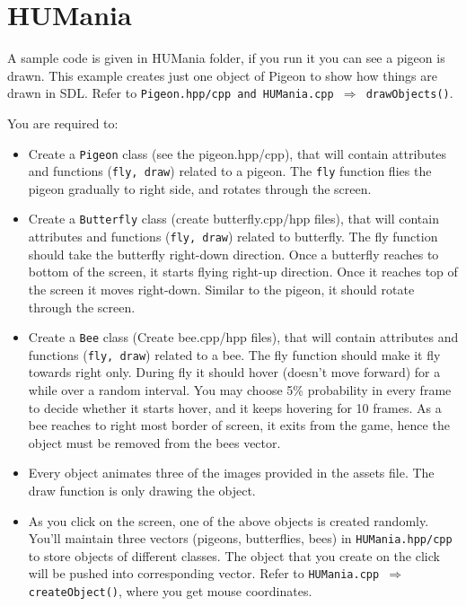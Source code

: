 \documentclass[a4paper,12pt]{article}
\begin{document}
	

	\section{HUMania}
	
	A sample code is given in HUMania folder, if you run it you can see a pigeon is drawn. This example creates just one object of Pigeon to show how things are drawn in SDL. Refer to \texttt{Pigeon.hpp/cpp and HUMania.cpp $ \Rightarrow $ drawObjects()}.
	
	 You are required to:
	 \begin{itemize}
	 	\item Create a \texttt{Pigeon} class (see the pigeon.hpp/cpp), that will contain attributes and functions (\texttt{fly, draw}) related to a pigeon. The \texttt{fly} function flies the pigeon gradually to right side, and rotates through the screen. 
	 	
	 	\item Create a \texttt{Butterfly} class (create butterfly.cpp/hpp files), that will contain attributes and functions (\texttt{fly, draw}) related to butterfly. The fly function should take the butterfly right-down direction. Once a butterfly reaches to bottom of the screen, it starts flying right-up direction. Once it reaches top of the screen it moves right-down. Similar to the pigeon, it should rotate through the screen. 
	 	
	 	\item Create a \texttt{Bee} class (Create bee.cpp/hpp files), that will contain attributes and functions (\texttt{fly, draw}) related to a bee. The fly function should make it fly towards right only. During fly it should hover (doesn't move forward) for a while over a random interval. You may choose 5\% probability in every frame to decide whether it starts hover, and it keeps hovering for 10 frames. As a bee reaches to right most border of screen, it exits from the game, hence the object must be removed from the bees vector.  
	 	
	 	\item Every object animates three of the images provided in the assets file. The draw function is only drawing the object.
	 	
	 	\item As you click on the screen, one of the above objects is created randomly. You'll maintain three vectors (pigeons, butterflies, bees) in \texttt{HUMania.hpp/cpp} to store objects of different classes. The object that you create on the click will be pushed into corresponding vector. Refer to \texttt{HUMania.cpp $ \Rightarrow $ createObject()}, where you get mouse coordinates.
	 	

\end{itemize}
\end{document}
